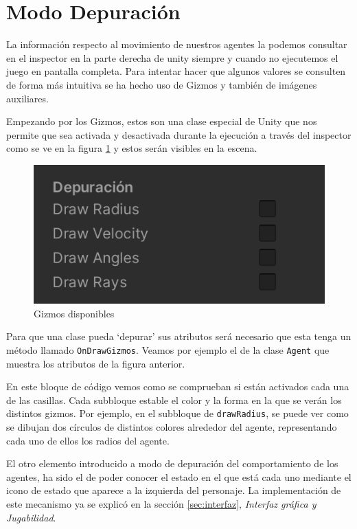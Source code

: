 \section{Modo Depuración}

La información respecto al movimiento de nuestros agentes la podemos consultar en el inspector en la parte derecha de unity siempre y cuando no ejecutemos el juego en pantalla completa. Para intentar hacer que algunos valores se consulten de forma más intuitiva se ha hecho uso de Gizmos y también de imágenes auxiliares.

Empezando por los Gizmos, estos son una clase especial de Unity que nos permite que sea activada y desactivada durante la ejecución a través del inspector como se ve en la figura \ref{fig:giz} y estos serán visibles en la escena.

\begin{figure}[H]
    \centering
    \includegraphics[scale=0.5]{images/Gizmos.png}
    \caption{Gizmos disponibles}
    \label{fig:giz}
\end{figure}

Para que una clase pueda `depurar' sus atributos será necesario que esta tenga un método llamado \texttt{OnDrawGizmos}. Veamos por ejemplo el de la clase \texttt{Agent} que muestra los atributos de la figura anterior. 



En este bloque de código vemos como se comprueban si están activados cada una de las casillas. Cada subbloque estable el color y la forma en la que se verán los distintos gizmos. Por ejemplo, en el subbloque de \texttt{drawRadius}, se puede ver como se dibujan dos círculos de distintos colores alrededor del agente, representando cada uno de ellos los radios del agente.

El otro elemento introducido a modo de depuración del comportamiento de los agentes, ha sido el de poder conocer el estado en el que está cada uno mediante el icono de estado que aparece a la izquierda del personaje. La implementación de este mecanismo ya se explicó en la sección \ref{sec:interfaz}, \textit{Interfaz gráfica y Jugabilidad}.